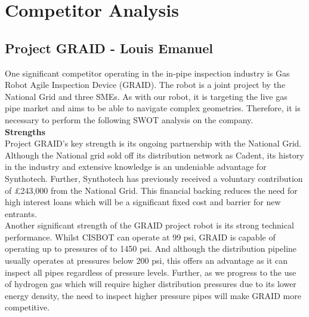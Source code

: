 \documentclass[11pt]{article}		%
\begin{document}
		\section{Competitor Analysis}
		
		\subsection[Project GRAID]{Project GRAID - Louis Emanuel}
			One significant competitor operating in the in-pipe inspection industry is Gas Robot Agile Inspection Device (GRAID). The robot is a joint project by the National Grid and three SMEs. As with our robot, it is targeting the live gas pipe market and aims to be able to navigate complex geometries. Therefore, it is necessary to perform the following SWOT analysis on the company. \\
			
			\textbf{Strengths} \\
			Project GRAID's key strength is its ongoing partnership with the National Grid. Although the National grid sold off its distribution network as Cadent, its history in the industry and extensive knowledge is an undeniable advantage for Synthotech. Further, Synthotech has previously received a voluntary contribution of £243,000 from the National Grid. This financial backing reduces the need for high interest loans which will be a significant fixed cost and barrier for new entrants. \\
		    \hspace*{3ex}Another significant strength of the GRAID project robot is its strong technical performance. Whilst CISBOT can operate at 99 psi, GRAID is capable of operating up to pressures of to 1450 psi. And although the distribution pipeline usually operates at pressures below 200 psi, this offers an advantage as it can inspect all pipes regardless of pressure levels. Further, as we progress to the use of hydrogen gas which will require higher distribution pressures due to its lower energy density, the need to inspect higher pressure pipes will make GRAID more competitive. 
	        
\end{document}
